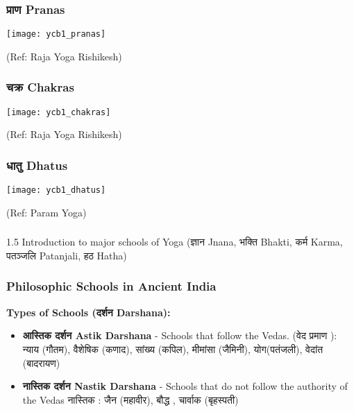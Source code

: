 \begin{frame}[fragile]\frametitle{प्राण Pranas}
        \begin{center}
        \texttt{[image: ycb1\_pranas]}
				
		{\tiny (Ref: Raja Yoga Rishikesh)}	 
        \end{center}	

\end{frame}
\begin{frame}[fragile]\frametitle{चक्र  Chakras}
        \begin{center}
        \texttt{[image: ycb1\_chakras]}
				
		{\tiny (Ref: Raja Yoga Rishikesh)}	 
        \end{center}	

\end{frame}

\begin{frame}[fragile]\frametitle{धातु Dhatus}
        \begin{center}
        \texttt{[image: ycb1\_dhatus]}
				
		{\tiny (Ref: Param Yoga)}	 
        \end{center}	

\end{frame}


\begin{frame}[fragile]\frametitle{}
\begin{center}
{\Large 1.5 Introduction to major schools of Yoga (ज्ञान Jnana, भक्ति  Bhakti, कर्म  Karma, पतञ्जलि  Patanjali, हठ Hatha)}
\end{center}
\end{frame}

\begin{frame}[fragile]\frametitle{Philosophic Schools in Ancient India}
    \textbf{Types of Schools (दर्शन  Darshana):}
    \begin{itemize}
        \item \textbf{आस्तिक  दर्शन Astik Darshana} - Schools that follow the Vedas. (वेद प्रमाण ): न्याय (गौतम), वैशेषिक (कणाद), सांख्य (कपिल), मीमांसा (जैमिनी), योग(पतंजली), वेदांत (बादरायण)
        \item \textbf{नास्तिक  दर्शन  Nastik Darshana} - Schools that do not follow the authority of the Vedas नास्तिक : जैन (महावीर), बौद्ध , चार्वाक (बृहस्पती)
    \end{itemize}
\end{frame}

